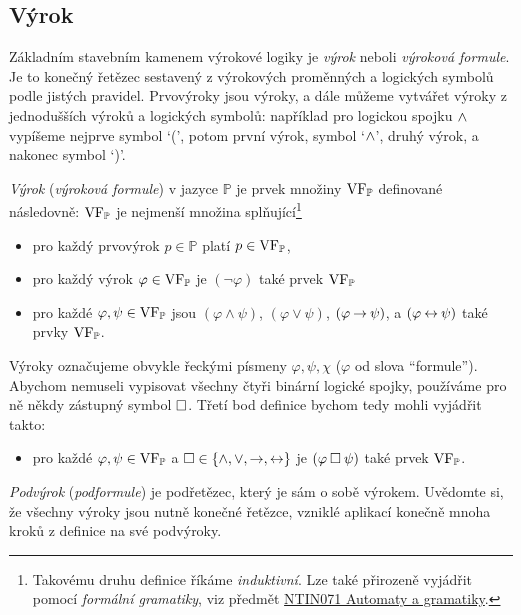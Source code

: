 \subsection{Výrok}

Základním stavebním kamenem výrokové logiky je \emph{výrok} neboli \emph{výroková formule}. Je to konečný řetězec sestavený z výrokových proměnných a logických symbolů podle jistých pravidel. Prvovýroky jsou výroky, a dále můžeme vytvářet výroky z jednodušších výroků a logických symbolů: například pro logickou spojku ${\land}$ vypíšeme nejprve symbol `(', potom první výrok, symbol `${\land}$', druhý výrok, a nakonec symbol `)'.
\begin{definition}[Výrok]\label{definition:proposition}
    \emph{Výrok} (\emph{výroková formule}) v jazyce $\mathbb P$ je prvek množiny $\operatorname{VF}_\mathbb P$ definované následovně: $\operatorname{VF}_\mathbb P$ je nejmenší množina splňující\footnote{Takovému druhu definice říkáme \emph{induktivní}. Lze také přirozeně vyjádřit pomocí \emph{formální gramatiky}, viz předmět \href{https://is.cuni.cz/studium/predmety/index.php?do=predmet&kod=NTIN071}{NTIN071 Automaty a gramatiky}.}
    \begin{itemize}
        \item pro každý prvovýrok $p\in\mathbb P$ platí $p\in\operatorname{VF}_\mathbb P$,
        \item pro každý výrok $\varphi\in\operatorname{VF}_\mathbb P$ je $(\neg\varphi)$ také prvek $\operatorname{VF}_\mathbb P$
        \item pro každé $\varphi,\psi\in\operatorname{VF}_\mathbb P$ jsou $(\varphi\land\psi)$, $(\varphi\lor\psi)$, $(\varphi\mathbin{\rightarrow}\psi)$, a $(\varphi\mathbin{\leftrightarrow}\psi)$ také prvky $\operatorname{VF}_\mathbb P$.
    \end{itemize}
\end{definition}
Výroky označujeme obvykle řeckými písmeny $\varphi,\psi,\chi$ ($\varphi$ od slova ``formule''). Abychom nemuseli vypisovat všechny čtyři binární logické spojky, používáme pro ně někdy zástupný symbol ${\mathbin{\square}}$. Třetí bod definice bychom tedy mohli vyjádřit takto:
\begin{itemize}
    \item pro každé $\varphi,\psi\in\operatorname{VF}_\mathbb P$ a ${\mathbin{\square}}\in\{{\land},{\lor},{\mathbin{\rightarrow}},{\mathbin{\leftrightarrow}}\}$ je $(\varphi\mathbin{\square}\psi)$ také prvek $\operatorname{VF}_\mathbb P$.
\end{itemize}


\emph{Podvýrok} (\emph{podformule}) je podřetězec, který je sám o sobě výrokem. Uvědomte si, že všechny výroky jsou nutně konečné řetězce, vzniklé aplikací konečně mnoha kroků z definice na své podvýroky.

